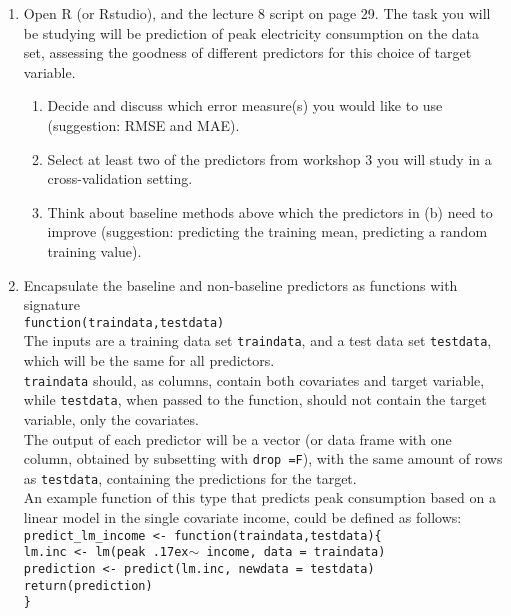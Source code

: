 \begin{enumerate}
\item  Open R (or Rstudio), and the lecture 8 script on page 29. The task you will be studying will be prediction of peak electricity consumption on the data set, assessing the goodness of different predictors for this choice of target variable.
    \begin{enumerate}
    \item Decide and discuss which error measure(s) you would like to use (suggestion: RMSE and MAE).
    \item Select at least two of the predictors from workshop 3 you will study in a cross-validation setting.
    \item Think about baseline methods above which the predictors in (b) need to improve (suggestion: predicting the training mean, predicting a random training value).
    \end{enumerate}

\item Encapsulate the baseline and non-baseline predictors as functions with signature\\
\texttt{function(traindata,testdata)}\\
The inputs are a training data set \texttt{traindata}, and a test data set \texttt{testdata}, which will be the same for all predictors.\\
\texttt{traindata} should, as columns, contain both covariates and target variable, while \texttt{testdata}, when passed to the function, should not contain the target variable, only the covariates.\\
The output of each predictor will be a vector (or data frame with one column, obtained by subsetting with \texttt{drop =F}), with the same amount of rows as \texttt{testdata}, containing the predictions for the target.\\
An example function of this type that predicts peak consumption based on a linear model in the single covariate income, could be defined as follows:\\

\texttt{predict\_lm\_income <- function(traindata,testdata)\{}\\
\texttt{lm.inc <- lm(peak {\raise.17ex\hbox{$\scriptstyle\sim$}} income, data = traindata)}\\
\texttt{prediction <- predict(lm.inc, newdata = testdata)}\\
\texttt{return(prediction)}\\
\texttt{\}}\\


\end{enumerate}
